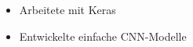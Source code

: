 \begin{itemize}
	\item Arbeitete mit Keras
    \item Entwickelte einfache CNN-Modelle
\end{itemize}
